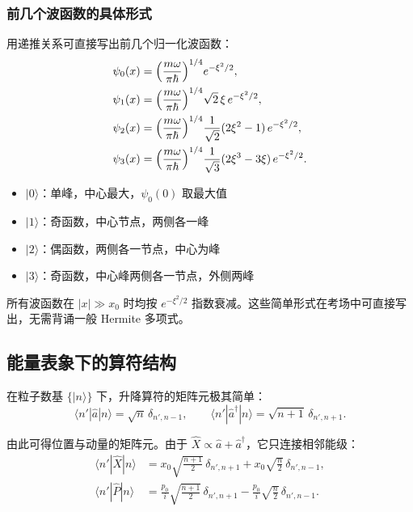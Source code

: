\subsubsection{前几个波函数的具体形式}

用递推关系可直接写出前几个归一化波函数：
\begin{align*}
\psi_0(x) &= \Bigl(\frac{m\omega}{\pi\hbar}\Bigr)^{1/4} e^{-\xi^2/2}, \\
\psi_1(x) &= \Bigl(\frac{m\omega}{\pi\hbar}\Bigr)^{1/4} \sqrt{2}\,\xi\,e^{-\xi^2/2}, \\
\psi_2(x) &= \Bigl(\frac{m\omega}{\pi\hbar}\Bigr)^{1/4} \frac{1}{\sqrt{2}}(2\xi^2-1)\,e^{-\xi^2/2}, \\
\psi_3(x) &= \Bigl(\frac{m\omega}{\pi\hbar}\Bigr)^{1/4} \frac{1}{\sqrt{3}}(2\xi^3-3\xi)\,e^{-\xi^2/2}.
\end{align*}

\begin{tipbox}[速记特征]
\begin{itemize}[nosep]
    \item $|0\rangle$：单峰，中心最大，$\psi_0(0)$ 取最大值
    \item $|1\rangle$：奇函数，中心节点，两侧各一峰
    \item $|2\rangle$：偶函数，两侧各一节点，中心为峰
    \item $|3\rangle$：奇函数，中心峰两侧各一节点，外侧两峰
\end{itemize}
所有波函数在 $|x|\gg x_0$ 时均按 $e^{-\xi^2/2}$ 指数衰减。这些简单形式在考场中可直接写出，无需背诵一般 Hermite 多项式。
\end{tipbox}

\subsection{能量表象下的算符结构}

在粒子数基 $\{|n\rangle\}$ 下，升降算符的矩阵元极其简单：
\begin{equation}
\boxed{\langle n'|\hat{a}|n\rangle = \sqrt{n}\,\delta_{n',n-1},
\qquad
\langle n'|\hat{a}^\dagger|n\rangle = \sqrt{n+1}\,\delta_{n',n+1}.}
\end{equation}

由此可得位置与动量的矩阵元。由于 $\hat{X}\propto \hat{a}+\hat{a}^\dagger$，它只连接相邻能级：
\begin{align}
\langle n'|\hat{X}|n\rangle &= x_0\sqrt{\frac{n+1}{2}}\,\delta_{n',n+1}
+ x_0\sqrt{\frac{n}{2}}\,\delta_{n',n-1}, \\
\langle n'|\hat{P}|n\rangle &= \frac{p_0}{i}\sqrt{\frac{n+1}{2}}\,\delta_{n',n+1}
- \frac{p_0}{i}\sqrt{\frac{n}{2}}\,\delta_{n',n-1}.
\end{align}

